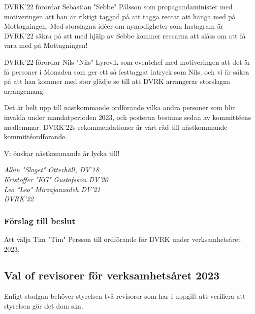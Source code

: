 \documentclass[protokoll]{dvd}
\begin{document}
DVRK'22 förordar Sebastian "Sebbe" Pålsson som propagandaminister med motiveringen att han är riktigt taggad på att tagga reccar att hänga med på Mottagningen.
Med storslagna idéer om nymodigheter som Instagram är DVRK'22 säkra på att med hjälp av Sebbe kommer reccarna att slåss om att få vara med på Mottagningen!

DVRK'22 förordar Nils "Nils" Lyrevik som eventchef med motiveringen att det är få personer i Monaden som ger ett så festtaggat intryck som Nils, och vi är säkra på att han kommer med stor glädje se till att DVRK arrangerar storslagna arrangemang.

Det är helt upp till nästkommande ordförande vilka andra personer som blir invalda under mandatperioden 2023, och posterna bestäms sedan av kommittéens medlemmar.
DVRK'22s rekommendationer är vårt råd till nästkommande kommittéordförande.

Vi önskar nästkommande år lycka till!

\emph{Albin "Slaget" Otterhäll, DV'18} \\
\emph{Kristoffer "KG" Gustafsson DV'20} \\
\emph{Leo "Leo" Mirzajanzadeh DV'21}\\
\emph{DVRK'22}

\subsubsection*{Förslag till beslut}
\begin{attsatser}
    \item Att välja Tim "Tim" Persson till ordförande för DVRK under verksamhetsåret 2023.
\end{attsatser}


\subsection{Val of revisorer för verksamhetsåret 2023}
Enligt stadgan behöver styrelsen två revisorer som har i uppgift
att verifiera att styrelsen gör det dom ska.
\end{document}
